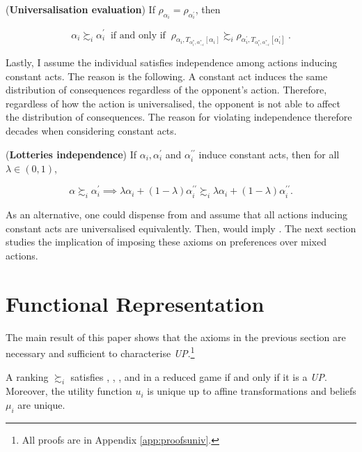 \begin{axiom}\label{ax:ceval}
	(\textbf{Universalisation evaluation}) If \( \rho_{\alpha_i} = \rho_{\alpha^{\prime}_{i}} \), then

	\[ \alpha_{i} \succsim_{i} \alpha^{\prime}_{i} \: \text{ if and only if } \: \rho_{\alpha_i, T_{\alpha^{*}_i, \alpha^{*}_{-i}} [ \alpha_i ]} \succsim_i \rho_{\alpha^{\prime}_i, T_{\alpha^{*}_i, \alpha^{*}_{-i}} [ \alpha^{\prime}_i ]} \: . \]
\end{axiom}

Lastly, I assume the individual satisfies independence among actions inducing constant acts. The reason is the following. A constant act induces the same distribution of consequences regardless of the opponent's action. Therefore, regardless of how the action is universalised, the opponent is not able to affect the distribution of consequences. The reason for violating independence therefore decades when considering constant acts.

\begin{axiom}\label{ax:lindep}
	 (\textbf{Lotteries independence}) If \( \alpha_i, \alpha^{\prime}_i \) and \( \alpha_{i}^{\prime \prime} \) induce constant acts, then for all \( \lambda \in (0,1) \),

	\[ \alpha \succsim_i \alpha^{\prime}_i \implies \lambda \alpha_i + ( 1- \lambda ) \alpha_{i}^{\prime \prime} \succsim_i \lambda \alpha_i + ( 1- \lambda ) \alpha_{i}^{\prime \prime} .\]
\end{axiom}

As an alternative, one could dispense from  and assume that all actions inducing constant acts are universalised equivalently. Then,  would imply . The next section studies the implication of imposing these axioms on preferences over mixed actions.

\section{Functional Representation}\label{sec:repuniv}

The main result of this paper shows that the axioms in the previous section are necessary and sufficient to characterise \textit{UP}.\footnote{All proofs are in Appendix \ref{app:proofsuniv}.}

\begin{theorem}\label{thm:sep}
	A ranking \( \succsim_i \) satisfies , , ,  and  in a reduced game if and only if it is a \textit{UP}. Moreover, the utility function \( u_i \) is unique up to affine transformations and beliefs \( \mu_i \) are unique.
\end{theorem}

